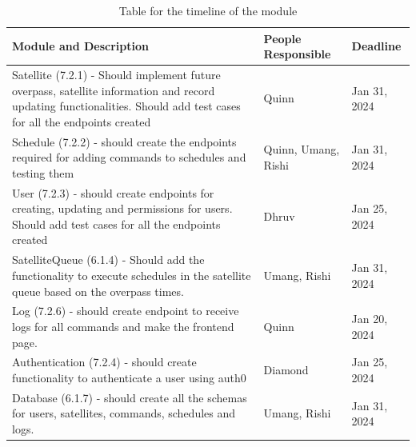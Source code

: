 \documentclass[12pt, titlepage]{article}
\begin{document}
\begin{center}
    \begin{table}
    \centering
    \begin{tabular}{p{} p{} p{}}

         \textbf{Module and Description}&  \textbf{People Responsible}& \textbf{Deadline}\\ \hline 
         Satellite (7.2.1) - Should implement future overpass, satellite information and record updating functionalities. Should add test cases for all the endpoints created&  Quinn& Jan 31, 2024\\ \hline 
         Schedule (7.2.2) - should create the endpoints required for adding commands to schedules and testing them&  Quinn, Umang, Rishi& Jan 31, 2024\\ \hline 
         User (7.2.3) - should create endpoints for creating, updating and permissions for users. Should add test cases for all the endpoints created&  Dhruv& Jan 25, 2024\\ \hline 
         SatelliteQueue (6.1.4) - Should add the functionality to execute schedules in the satellite queue based on the overpass times.&  Umang, Rishi& Jan 31, 2024\\ \hline 
         Log (7.2.6) - should create endpoint to receive logs for all commands and make the frontend page.&  Quinn& Jan 20, 2024\\ \hline 
         Authentication (7.2.4) - should create functionality to authenticate a user using auth0&  Diamond& Jan 25, 2024\\ \hline 
         Database (6.1.7) - should create all the schemas for users, satellites, commands, schedules and logs.&  Umang, Rishi& Jan 31, 2024\\ \hline 
    \end{tabular}
    \caption{Table for the timeline of the module}
    \label{tab:my_label}
\end{table}
\end{center}

\end{document}
